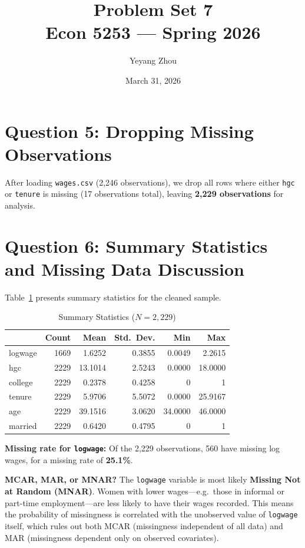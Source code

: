 \documentclass[12pt]{article}
\title{Problem Set 7 \\ \large Econ 5253 --- Spring 2026}
\author{Yeyang Zhou}
\date{March 31, 2026}
\begin{document}
\maketitle

\section*{Question 5: Dropping Missing Observations}

After loading \texttt{wages.csv} (2,246 observations), we drop all rows
where either \texttt{hgc} or \texttt{tenure} is missing (17 observations
total), leaving \textbf{2,229 observations} for analysis.

\section*{Question 6: Summary Statistics and Missing Data Discussion}

Table~\ref{tab:summary} presents summary statistics for the cleaned sample.

\begin{table}[ht]
\centering
\caption{Summary Statistics ($N = 2{,}229$)}
\label{tab:summary}
\begin{tabular}{lrrrrr}
\toprule
 & Count & Mean & Std.\ Dev. & Min & Max \\
\midrule
logwage & 1669   & 1.6252  & 0.3855 & 0.0049 & 2.2615 \\
hgc     & 2229   & 13.1014 & 2.5243 & 0.0000 & 18.0000 \\
college & 2229   & 0.2378  & 0.4258 & 0 & 1 \\
tenure  & 2229   & 5.9706  & 5.5072 & 0.0000 & 25.9167 \\
age     & 2229   & 39.1516 & 3.0620 & 34.0000 & 46.0000 \\
married & 2229   & 0.6420  & 0.4795 & 0 & 1 \\
\bottomrule
\end{tabular}
\end{table}

\noindent\textbf{Missing rate for \texttt{logwage}:}
Of the 2,229 observations, 560 have missing log wages, for a missing
rate of \textbf{25.1\%}.

\medskip
\noindent\textbf{MCAR, MAR, or MNAR?}
The \texttt{logwage} variable is most likely \textbf{Missing Not at
Random (MNAR)}. Women with lower wages---e.g.\ those in informal or
part-time employment---are less likely to have their wages recorded.
This means the probability of missingness is correlated with the
unobserved value of \texttt{logwage} itself, which rules out both
MCAR (missingness independent of all data) and MAR (missingness
dependent only on observed covariates).
\end{document}
